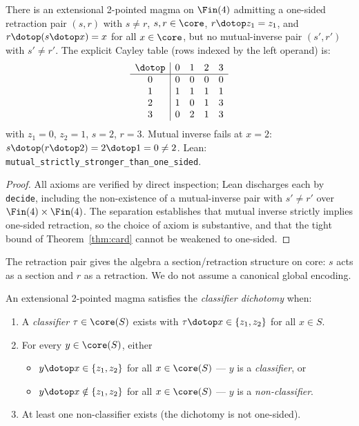 \begin{proposition}
\label{prop:one-sided-sep}
There is an extensional 2-pointed magma on $\Fin(4)$ admitting a
one-sided retraction pair $(s, r)$ with $s \neq r$, $s, r \in \core$,
$r \dotop z_1 = z_1$, and $r \dotop (s \dotop x) = x$ for all
$x \in \core$, but no mutual-inverse pair $(s', r')$ with $s' \neq r'$.
The explicit Cayley table (rows indexed by the left operand) is:
\[
\begin{array}{c|cccc}
\dotop & 0 & 1 & 2 & 3 \\ \hline
0 & 0 & 0 & 0 & 0 \\
1 & 1 & 1 & 1 & 1 \\
2 & 1 & 0 & 1 & 3 \\
3 & 0 & 2 & 1 & 3
\end{array}
\]
with $z_1 = 0$, $z_2 = 1$, $s = 2$, $r = 3$. Mutual inverse fails at
$x = 2$: $s \dotop (r \dotop 2) = 2 \dotop 1 = 0 \neq 2$. Lean:
\texttt{mutual\_strictly\_stronger\_than\_one\_sided}.
\end{proposition}

\begin{proof}
All axioms are verified by direct inspection; Lean discharges each by
\texttt{decide}, including the non-existence of a mutual-inverse pair
with $s' \neq r'$ over $\Fin(4) \times \Fin(4)$. The separation
establishes that mutual inverse strictly implies one-sided retraction,
so the choice of axiom is substantive, and that the tight bound of
Theorem~\ref{thm:card} cannot be weakened to one-sided.
\end{proof}

The retraction pair gives the algebra a section/retraction structure on
core: $s$ acts as a section and $r$ as a retraction. We do not assume a
canonical global encoding.

\begin{definition}
\label{def:cd}
An extensional 2-pointed magma satisfies the \emph{classifier dichotomy}
when:
\begin{enumerate}
  \item A \emph{classifier} $\tau \in \core(S)$ exists with
    $\tau \dotop x \in \{z_1, z_2\}$ for all $x \in S$.
  \item For every $y \in \core(S)$, either
    \begin{itemize}
      \item $y \dotop x \in \{z_1, z_2\}$ for all $x \in \core(S)$ ---
        $y$ is a \emph{classifier}, or
      \item $y \dotop x \notin \{z_1, z_2\}$ for all $x \in \core(S)$ ---
        $y$ is a \emph{non-classifier}.
    \end{itemize}
  \item At least one non-classifier exists (the dichotomy is not
    one-sided).
\end{enumerate}
\end{definition}

